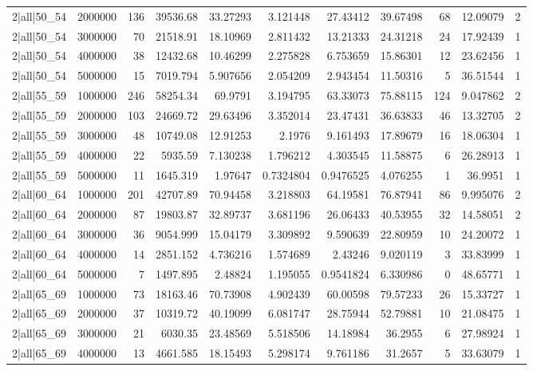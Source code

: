 \begin{tabular}{lrrrrrrrrrr}
2|all|50\_54 & 2000000 & 136 & 39536.68 & 33.27293 & 3.121448 & 27.43412 & 39.67498 & 68 & 12.09079 & 2 \\
2|all|50\_54 & 3000000 & 70 & 21518.91 & 18.10969 & 2.811432 & 13.21333 & 24.31218 & 24 & 17.92439 & 1 \\
2|all|50\_54 & 4000000 & 38 & 12432.68 & 10.46299 & 2.275828 & 6.753659 & 15.86301 & 12 & 23.62456 & 1 \\
2|all|50\_54 & 5000000 & 15 & 7019.794 & 5.907656 & 2.054209 & 2.943454 & 11.50316 & 5 & 36.51544 & 1 \\
2|all|55\_59 & 1000000 & 246 & 58254.34 & 69.9791 & 3.194795 & 63.33073 & 75.88115 & 124 & 9.047862 & 2 \\
2|all|55\_59 & 2000000 & 103 & 24669.72 & 29.63496 & 3.352014 & 23.47431 & 36.63833 & 46 & 13.32705 & 2 \\
2|all|55\_59 & 3000000 & 48 & 10749.08 & 12.91253 & 2.1976 & 9.161493 & 17.89679 & 16 & 18.06304 & 1 \\
2|all|55\_59 & 4000000 & 22 & 5935.59 & 7.130238 & 1.796212 & 4.303545 & 11.58875 & 6 & 26.28913 & 1 \\
2|all|55\_59 & 5000000 & 11 & 1645.319 & 1.97647 & 0.7324804 & 0.9476525 & 4.076255 & 1 & 36.9951 & 1 \\
2|all|60\_64 & 1000000 & 201 & 42707.89 & 70.94458 & 3.218803 & 64.19581 & 76.87941 & 86 & 9.995076 & 2 \\
2|all|60\_64 & 2000000 & 87 & 19803.87 & 32.89737 & 3.681196 & 26.06433 & 40.53955 & 32 & 14.58051 & 2 \\
2|all|60\_64 & 3000000 & 36 & 9054.999 & 15.04179 & 3.309892 & 9.590639 & 22.80959 & 10 & 24.20072 & 1 \\
2|all|60\_64 & 4000000 & 14 & 2851.152 & 4.736216 & 1.574689 & 2.43246 & 9.020119 & 3 & 33.83999 & 1 \\
2|all|60\_64 & 5000000 & 7 & 1497.895 & 2.48824 & 1.195055 & 0.9541824 & 6.330986 & 0 & 48.65771 & 1 \\
2|all|65\_69 & 1000000 & 73 & 18163.46 & 70.73908 & 4.902439 & 60.00598 & 79.57233 & 26 & 15.33727 & 1 \\
2|all|65\_69 & 2000000 & 37 & 10319.72 & 40.19099 & 6.081747 & 28.75944 & 52.79881 & 10 & 21.08475 & 1 \\
2|all|65\_69 & 3000000 & 21 & 6030.35 & 23.48569 & 5.518506 & 14.18984 & 36.2955 & 6 & 27.98924 & 1 \\
2|all|65\_69 & 4000000 & 13 & 4661.585 & 18.15493 & 5.298174 & 9.761186 & 31.2657 & 5 & 33.63079 & 1 \\

\end{tabular}
